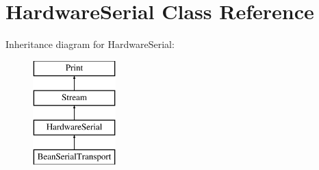 \hypertarget{class_hardware_serial}{}\section{Hardware\+Serial Class Reference}
\label{class_hardware_serial}
Inheritance diagram for Hardware\+Serial\+:\begin{figure}[H]
\begin{center}
\leavevmode
\includegraphics[height=4.000000cm]{class_hardware_serial}
\end{center}
\end{figure}
